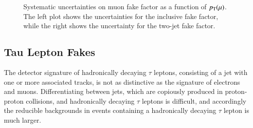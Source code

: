 \begin{figure}
  \centering
  \caption{Systematic uncertainties on muon fake factor as a function of $p_{\text{T}}(\mu)$.  The left plot shows the uncertainties for the inclusive fake factor, while the right shows the uncertainty for the two-jet fake factor.}
  \label{fig:MuFake_syst}
\end{figure}



\subsection{Tau Lepton Fakes}\label{sec:ff-tau}
The detector signature of hadronically decaying $\tau$ leptons, consisting of a jet with one or more associated tracks, is not as distinctive as the signature of electrons and muons. Differentiating between jets, which are copiously produced in proton-proton collisions, and hadronically decaying $\tau$ leptons is difficult, and accordingly the reducible backgrounds in events containing a hadronically decaying $\tau$ lepton is much larger. 

